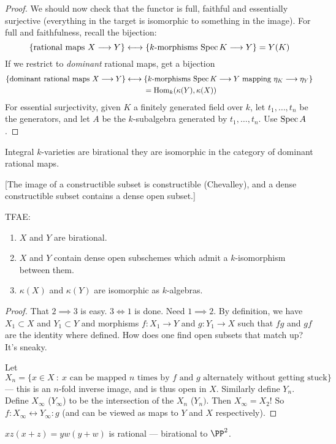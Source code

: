 \documentclass[11pt]{article}
\begin{document}
\begin{Oct18}
\begin{proof}
We should now check that the functor is full, faithful and essentially surjective (everything in the target is isomorphic to something in the image). For full and faithfulness, recall the bijection:
\[\{\text{rational maps $X\longrightarrow Y$}\}\longleftrightarrow\{\text{$k$-morphisms $\operatorname{Spec} K\longrightarrow Y$}\}=Y(K)\]
If we restrict to \emph{dominant} rational maps, get a bijection
\begin{alignat*}{2}
\{\text{dominant rational maps $X\longrightarrow Y$}\}&\longleftrightarrow\{\text{$k$-morphisms $\operatorname{Spec} K\longrightarrow Y$ mapping $\eta_K\longrightarrow \eta_Y$}\}\\
&\ \qquad=\operatorname{Hom}_k(\kappa(Y),\kappa(X))
\end{alignat*}
For essential surjectivity, given $K$ a finitely generated field over $k$, let $t_1,\ldots,t_n$ be the generators, and let $A$ be the $k$-subalgebra generated by $t_1,\ldots,t_n$. Use $\operatorname{Spec} A$.
\end{proof}
\begin{defn*}
Integral $k$-varieties are birational \Iff they are isomorphic in the category of dominant rational maps.
\end{defn*}
[The image of a constructible subset is constructible (Chevalley), and a dense constructible subset contains a dense open subset.]
\begin{prop*} TFAE:
\begin{enumerate}\squishlist
\item $X$ and $Y$ are birational.
\item $X$ and $Y$ contain dense open subschemes which admit a $k$-isomorphism between them.
\item $\kappa(X)$ and $\kappa(Y)$ are isomorphic as $k$-algebras.
\end{enumerate}
\end{prop*}
\begin{proof}
That $2\implies 3$ is easy. $3\iff 1$ is done. Need $1\implies 2$. By definition, we have $X_1\subset X$ and $Y_1\subset Y$ and morphisms $f:X_1\to Y$ and $g:Y_1\to X$ such that $fg$ and $gf$ are the identity where defined. How does one find open subsets that match up? It's sneaky.

Let $X_n=\{x\in X\ :\ \text{$x$ can be mapped $n$ times by $f$ and $g$ alternately without getting stuck}\}$ --- this is an $n$-fold inverse image, and is thus open in $X$. Similarly define $Y_n$. Define $X_\infty$ ($Y_\infty$) to be the intersection of the $X_n$ ($Y_n)$. Then $X_\infty=X_2$! So $f:X_\infty\longleftrightarrow Y_\infty:g$ (and can be viewed as maps to $Y$ and $X$ respectively).
\end{proof}
\begin{exmp*}
$xz(x+z)=yw(y+w)$ is rational --- birational to $\PP^2$.
\end{exmp*}
\end{Oct18}
\end{document}
